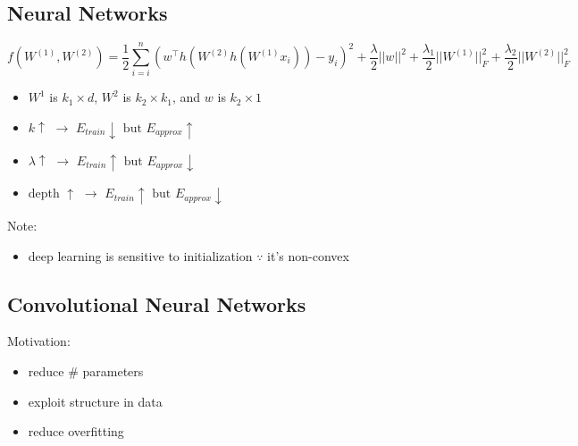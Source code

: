 \documentclass[10pt,landscape,a4paper]{article}
\begin{document}
\begin{multicols*}{5}
\section{Neural Networks}
\begin{dmath*}
    f(W^{(1)},W^{(2)}) = \frac{1}{2} \sum_{i=i}^{n} (w^\intercal h(W^{(2)}h(W^{(1)}x_i))-y_i)^2 + \frac{\lambda}{2}||w||^2 + \frac{\lambda_1}{2} ||W^{(1)}||_F^2 + \frac{\lambda_2}{2} ||W^{(2)}||_F^2
\end{dmath*}
\begin{itemize}
    \item \(W^1\) is \(k_1 \times d\), \(W^2\) is \(k_2 \times k_1\), and \(w\) is \(k_2 \times 1\)
    \item \(k \uparrow \) \(\rightarrow \) \(E_{train} \downarrow \text{ but } E_{approx} \uparrow \)
    \item \(\lambda \uparrow \) \(\rightarrow \) \(E_{train} \uparrow \text{ but } E_{approx} \downarrow \)
    \item depth \(\uparrow \) \(\rightarrow \) \(E_{train} \uparrow \text{ but } E_{approx} \downarrow \)
\end{itemize}

Note:
\begin{itemize}
    \item deep learning is sensitive to initialization \(\because\) it's non-convex
\end{itemize}

\subsection{Convolutional Neural Networks}
Motivation:
\begin{itemize}
    \item reduce \# parameters
    \item exploit structure in data
    \item reduce overfitting
\end{itemize}


\end{multicols*}
\end{document}
